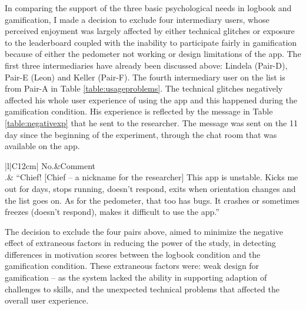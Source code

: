 In comparing the support of the three basic psychological needs in logbook and gamification, I made a decision to exclude four intermediary users, whose perceived enjoyment was largely affected by either technical glitches or exposure to the leaderboard coupled with the inability to participate fairly in gamification because of either the pedometer not working or design limitations of the app. The first three intermediaries have already been discussed above: Lindela (Pair-D), Pair-E (Leon) and Keller (Pair-F). The fourth intermediary user on the list is from Pair-A in Table \ref{table:usageproblems}. The technical glitches negatively affected his whole user experience of using the app and this happened during the gamification condition. His experience is reflected by the message in Table \ref{table:negativexp} that he sent to the researcher. The message was sent on the 11 day since the beginning of the experiment, through the chat room that was available on the app. 

\begin{table}[h!]
\renewcommand{\baselinestretch}{1.5}
  \begin{center}
    \caption{Excerpt: an example of negative user experience due to technical glitches.}
    \label{table:negativexp}
	\begin{tabular}{|l|C{12cm}|}
		\hline
		No.&Comment\\
		.& {``Chief! [Chief -- a nickname for the researcher] This app is unstable. Kicks me out for days, stops running, doesn't respond, exits when orientation changes and the list goes on. As for the pedometer, that too has bugs. It crashes or sometimes freezes (doesn't respond), makes it difficult to use the app.''}\\
		\hline
	\end{tabular}
  \end{center}
\end{table}    

The decision to exclude the four pairs above, aimed to minimize the negative effect of extraneous factors in reducing the power of the study, in detecting differences in motivation scores between the logbook condition and the gamification condition. These extraneous factors were: weak design  for gamification -- as the system lacked the ability in supporting adaption of challenges to skills, and the unexpected technical problems that affected the overall user experience. 

